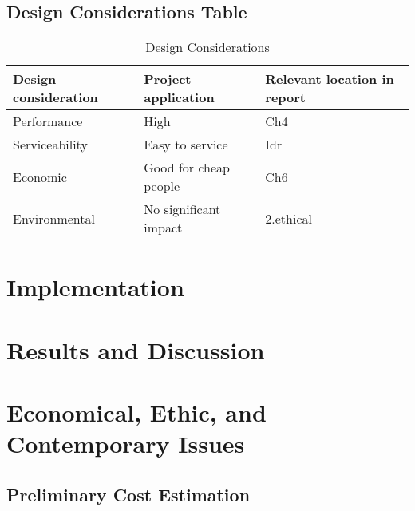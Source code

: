 \documentclass[12pt]{report}
\begin{document}
\section{Design Considerations Table}
\begin{tabular}
    \begin{table}[h!]
        \centering
        \begin{tabular}{|>{\centering\arraybackslash}m{5cm}|>{\centering\arraybackslash}m{5cm}|>{\centering\arraybackslash}m{5cm}|}
            \hline
            \textbf{Design consideration} & \textbf{Project application} & \textbf{Relevant location in report} \\
            \hline
            Performance & High & Ch4 \\
            \hline
            Serviceability & Easy to service & Idr \\
            \hline
            Economic & Good for cheap people & Ch6 \\
            \hline
            Environmental & No significant impact & 2.ethical \\
            \hline
        \end{tabular}
        \caption{Design Considerations}
        \label{tab:design_considerations}
    \end{table}
\end{tabular}
\chapter{Implementation}

\chapter{Results and Discussion}

\chapter{Economical, Ethic, and Contemporary Issues}
\section{Preliminary Cost Estimation}
\end{document}
